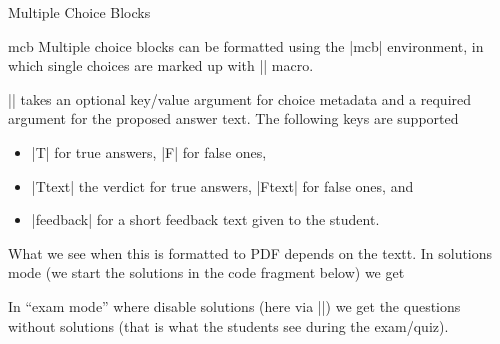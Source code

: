 \begin{sfragment}{Multiple Choice Blocks}
\begin{environment}{mcb}
  Multiple choice blocks can be formatted using the |mcb| environment, in which single
  choices are marked up with |\mcc| macro.
\end{environment}

\begin{function}{\mcc}
  || takes an optional key/value argument
   for choice metadata and a required argument  for the proposed
  answer text. The following keys are supported
  \begin{itemize}
  \item |T| for true answers, |F| for false ones,
  \item |Ttext| the verdict for true answers, |Ftext| for false ones, and
  \item |feedback| for a short feedback text given to the student.
  \end{itemize}
\end{function}
What we see when this is formatted to PDF depends on the textt. In solutions mode (we
start the solutions in the code fragment below) we get


In ``exam mode'' where disable solutions (here via |\stopsolutions|)
we get the questions without solutions (that is what the students see during the
exam/quiz).
\end{sfragment}

